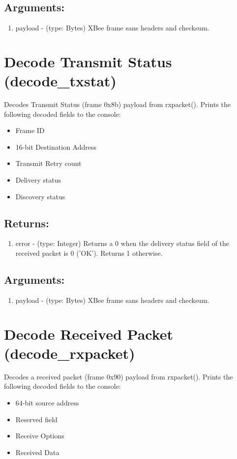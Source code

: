 \subsection{Arguments:}
\begin{enumerate}
\item payload - (type: Bytes) XBee frame sans headers and checksum.
\end{enumerate}

\section{Decode Transmit Status (decode\_txstat)}
Decodes Transmit Status (frame 0x8b) payload from rxpacket(). Prints the following decoded fields to the console:
\begin{itemize}
\item Frame ID
\item 16-bit Destination Address
\item Transmit Retry count
\item Delivery status
\item Discovery status
\end{itemize}
\subsection{Returns:}
\begin{enumerate}
\item error - (type: Integer) Returns a 0 when the delivery status field of the received packet is 0 ('OK'). Returns 1 otherwise.
\end{enumerate}
\subsection{Arguments:}
\begin{enumerate}
\item payload - (type: Bytes) XBee frame sans headers and checksum.
\end{enumerate}

\section{Decode Received Packet (decode\_rxpacket)}
Decodes a received packet (frame 0x90) payload from rxpacket(). Prints the following decoded fields to the console:
\begin{itemize}
\item 64-bit source address
\item Reserved field
\item Receive Options
\item Received Data
\end{itemize}
